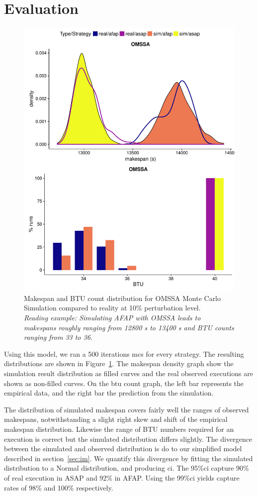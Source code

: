 \documentclass[10pt,conference,compsocconf]{IEEEtran}
\begin{document}
\section{Evaluation}
\label{sec:eval}
\begin{figure}
	\center
	\includegraphics[width=0.9\linewidth]{gfx/PP_fit.pdf}
	\caption[caption]{Makespan and BTU count distribution for OMSSA Monte
	  Carlo Simulation compared to reality at 10\% perturbation level.\\ 
	  \textit{Reading example: Simulating AFAP with OMSSA leads to makespans 
	  roughly ranging from 12800 s to 13400 s and BTU counts ranging from 33 to 36.}
	}
	\label{fig:fit}
\end{figure}
Using this model,  we ran a 500 iterations \ac{mcs} for every strategy.
The  resulting distributions are  shown  in  Figure~\ref{fig:fit}. 
The makespan  density  graph  show  the simulation  result  distribution as
filled  curves and the  real  observed executions are shown as  non-filled 
curves. On the \ac{btu} count graph, the left bar represents
the empirical data, and the right  bar the prediction from the simulation. 

The distribution  of simulated makespan covers fairly  well the
ranges of  observed makespans, notwithstanding a  slight right skew and shift of
the empirical makespan distribution. Likewise the range of BTU numbers required 
for an execution is correct but the simulated distribution differs slightly. The
divergence between the simulated and observed distribution is do to our
simplified model described in section~\ref{sec:im}. We quantify this divergence
by fitting the simulated distribution to a Normal distribution, and producing
\ac{ci}. The 95\%\ac{ci} capture 90\% of real execution in ASAP and 92\% in
AFAP. Using the 99\%\ac{ci} yields capture rates of 98\% and 100\% respectively.
\end{document}
